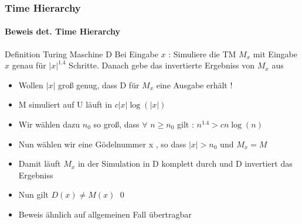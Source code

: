 \begin{frame}
	\frametitle{Time Hierarchy}
	\framesubtitle{Beweis det. Time Hierarchy}
	\begin{KITinfoblock}{Definition Turing Maschine D} 
		Bei Eingabe $x$ : Simuliere die TM $M_x$ mit Eingabe $x$ genau für $|x|^{1.4}$
		 Schritte. Danach gebe das invertierte Ergebniss von $M_x$	aus			
	\end{KITinfoblock}
	
	\begin{itemize}[<+->]
		\item Wollen $|x|$ groß genug, dass D für $M_x$ eine Ausgabe erhält !
		\item M simuliert auf U läuft in $c|x|\log(|x|)$
		\item Wir wählen dazu $n_0$ so groß, dass $\forall$ $n \geq n_0$ gilt :
			$n^{1.4} > cn\log(n)$		
		\item Nun wählen wir eine Gödelnummer x , so dass $|x| > n_0$ und $M_x = M$
		\item Damit läuft $M_x$ in der Simulation in D komplett durch und D invertiert
			das Ergebniss
		\item Nun gilt $D(x) \neq M(x)$ 	\qed 
		\item Beweis ähnlich auf allgemeinen Fall übertragbar
	\end{itemize}
\end{frame}
